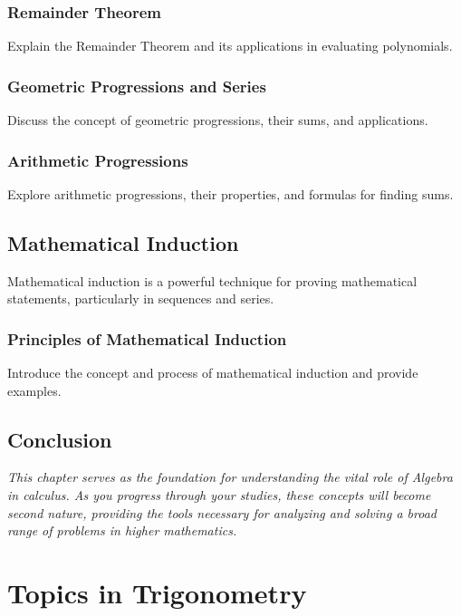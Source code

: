 \documentclass[a4paper,12pt]{book}
\newcounter{problem}
\begin{document}
\subsection{Remainder Theorem}
\label{subsec:remainder_theorem}
Explain the Remainder Theorem and its applications in evaluating polynomials.


\subsection{Geometric Progressions and Series}
\label{subsec:geometric_progressions_series}
Discuss the concept of geometric progressions, their sums, and applications.


\subsection{Arithmetic Progressions}
\label{subsec:arithmetic_progressions}
Explore arithmetic progressions, their properties, and formulas for finding sums.


\section{Mathematical Induction}
\label{sec:mathematical_induction}
Mathematical induction is a powerful technique for proving mathematical statements, particularly in sequences and series.


\subsection{Principles of Mathematical Induction}
\label{subsec:principles_mathematical_induction}
Introduce the concept and process of mathematical induction and provide examples.


\section*{Conclusion}
\label{sec:alg_conclusion}
\textit{This chapter serves as the foundation for understanding the vital role of Algebra in calculus. As you progress through your studies, these concepts will become second nature, providing the tools necessary for analyzing and solving a broad range of problems in higher mathematics.}



\chapter{Topics in Trigonometry}
\end{document}
